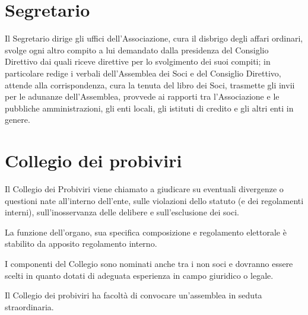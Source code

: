 \documentclass[legalpaper, 11pt]{exam}
\let\tempone\enumerate
\let\temptwo\endenumerate
\renewenvironment{enumerate}{\tempone\addtolength{\itemsep}{-0.45\baselineskip}}{\temptwo}
\begin{document}
{\section{Segretario}
\begin{enumerate}
	\item Il Segretario dirige gli uffici dell’Associazione, cura il disbrigo degli affari ordinari, svolge ogni altro compito a lui demandato dalla presidenza del Consiglio Direttivo dai quali riceve direttive per lo svolgimento dei suoi compiti; in particolare redige i verbali dell’Assemblea dei Soci e del Consiglio Direttivo, attende alla corrispondenza, cura la tenuta del libro dei Soci, trasmette gli invii per le adunanze dell’Assemblea, provvede ai rapporti tra l’Associazione e le pubbliche amministrazioni, gli enti locali, gli istituti di credito e gli altri enti in genere.
\end{enumerate}

\section{Collegio dei probiviri}
\begin{enumerate}
 \item Il Collegio dei Probiviri viene chiamato a giudicare su eventuali divergenze o questioni nate all’interno dell’ente, sulle violazioni dello statuto (e dei regolamenti interni), sull’inosservanza delle delibere e sull’esclusione dei soci.
 \item La funzione dell’organo, sua specifica composizione e regolamento elettorale è stabilito da apposito regolamento interno.
 \item I componenti del Collegio sono nominati anche tra i non soci e dovranno essere scelti in quanto dotati di adeguata esperienza in campo giuridico o legale.
 \item Il Collegio dei probiviri ha facoltà di convocare un’assemblea in seduta straordinaria.
\end{enumerate}

}
\end{document}
